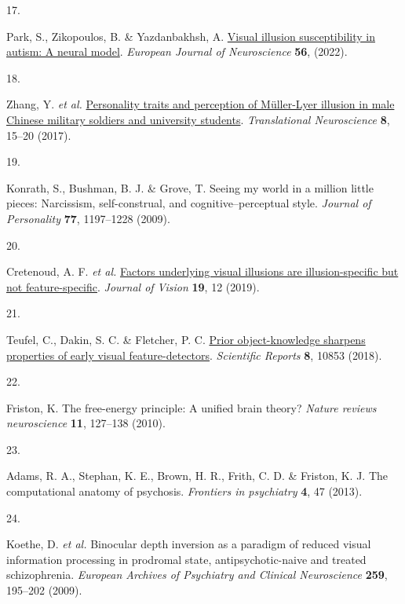 \documentclass[
  man,floatsintext]{apa6}
\newlength{\cslhangindent}
\newlength{\csllabelwidth}
\newlength{\cslentryspacingunit} %
\newenvironment{CSLReferences}[2] %
 {%
  \setlength{\parindent}{0pt}
  \ifodd #1
  \let\oldpar\par
  \def\par{\hangindent=\cslhangindent\oldpar}
  \fi
  \setlength{\parskip}{#2\cslentryspacingunit}
 }%
 {}
\newcommand{\CSLLeftMargin}[1]{\parbox[t]{\csllabelwidth}{#1}}
\newcommand{\CSLRightInline}[1]{\parbox[t]{\linewidth - \csllabelwidth}{#1}\break}
\begin{document}
\begin{CSLReferences}{0}{0}
\leavevmode{}%
\CSLLeftMargin{17. }%
\CSLRightInline{Park, S., Zikopoulos, B. \& Yazdanbakhsh, A. \href{https://doi.org/10.1111/ejn.15739}{Visual illusion susceptibility in autism: A neural model}. \emph{European Journal of Neuroscience} \textbf{56}, (2022).}

\leavevmode{}%
\CSLLeftMargin{18. }%
\CSLRightInline{Zhang, Y. \emph{et al.} \href{https://doi.org/10.1515/tnsci-2017-0004}{Personality traits and perception of Müller-Lyer illusion in male Chinese military soldiers and university students}. \emph{Translational Neuroscience} \textbf{8}, 15--20 (2017).}

\leavevmode{}%
\CSLLeftMargin{19. }%
\CSLRightInline{Konrath, S., Bushman, B. J. \& Grove, T. Seeing my world in a million little pieces: Narcissism, self-construal, and cognitive--perceptual style. \emph{Journal of Personality} \textbf{77}, 1197--1228 (2009).}

\leavevmode{}%
\CSLLeftMargin{20. }%
\CSLRightInline{Cretenoud, A. F. \emph{et al.} \href{https://doi.org/10.1167/19.14.12}{Factors underlying visual illusions are illusion-specific but not feature-specific}. \emph{Journal of Vision} \textbf{19}, 12 (2019).}

\leavevmode{}%
\CSLLeftMargin{21. }%
\CSLRightInline{Teufel, C., Dakin, S. C. \& Fletcher, P. C. \href{https://doi.org/10.1038/s41598-018-28845-5}{Prior object-knowledge sharpens properties of early visual feature-detectors}. \emph{Scientific Reports} \textbf{8}, 10853 (2018).}

\leavevmode{}%
\CSLLeftMargin{22. }%
\CSLRightInline{Friston, K. The free-energy principle: A unified brain theory? \emph{Nature reviews neuroscience} \textbf{11}, 127--138 (2010).}

\leavevmode{}%
\CSLLeftMargin{23. }%
\CSLRightInline{Adams, R. A., Stephan, K. E., Brown, H. R., Frith, C. D. \& Friston, K. J. The computational anatomy of psychosis. \emph{Frontiers in psychiatry} \textbf{4}, 47 (2013).}

\leavevmode{}%
\CSLLeftMargin{24. }%
\CSLRightInline{Koethe, D. \emph{et al.} Binocular depth inversion as a paradigm of reduced visual information processing in prodromal state, antipsychotic-naive and treated schizophrenia. \emph{European Archives of Psychiatry and Clinical Neuroscience} \textbf{259}, 195--202 (2009).}


\end{CSLReferences}
\end{document}
